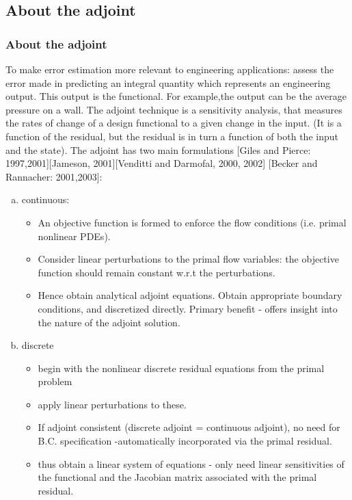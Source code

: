 \documentclass{beamer}
\begin{document}
\subsection[Adjoint]{About the adjoint}
\begin{frame}%
\scriptsize
\frametitle{About the adjoint}
To make error estimation more relevant to engineering applications: assess the error made in predicting an integral quantity which represents an engineering output. This output is the functional. For example,the output can be the average pressure on a wall. 
\newline The adjoint technique is a sensitivity analysis, that measures the rates of change of a design functional to a given change in the input. (It is a function of the residual, but the residual is in turn a function of both the input and the state). \newline
The adjoint has two main formulations [Giles and Pierce: 1997,2001][Jameson, 2001][Venditti and Darmofal, 2000, 2002] [Becker and Rannacher: 2001,2003]:
\begin{enumerate}[(a)]
\item continuous:
\begin{itemize} 
\tiny
\item An objective function is formed to enforce the flow conditions (i.e. primal nonlinear PDEs). 
\item Consider linear perturbations to the primal flow variables: the objective function should remain constant w.r.t the perturbations.
\item Hence obtain analytical adjoint equations. Obtain appropriate boundary conditions, and discretized directly. Primary benefit - offers insight into the nature of the adjoint solution.
\end{itemize}
\item discrete 
\begin{itemize}
\tiny
\item begin with the nonlinear discrete residual equations from the primal problem
\item apply linear perturbations to these. 
\item If adjoint consistent (discrete adjoint = continuous adjoint), no need for B.C. specification -automatically incorporated via the primal residual.   
\item thus obtain a linear system of equations - only need linear sensitivities of the functional and the Jacobian matrix associated with the primal residual.
\end{itemize}
\end{enumerate}
\end{frame}
\end{document}
